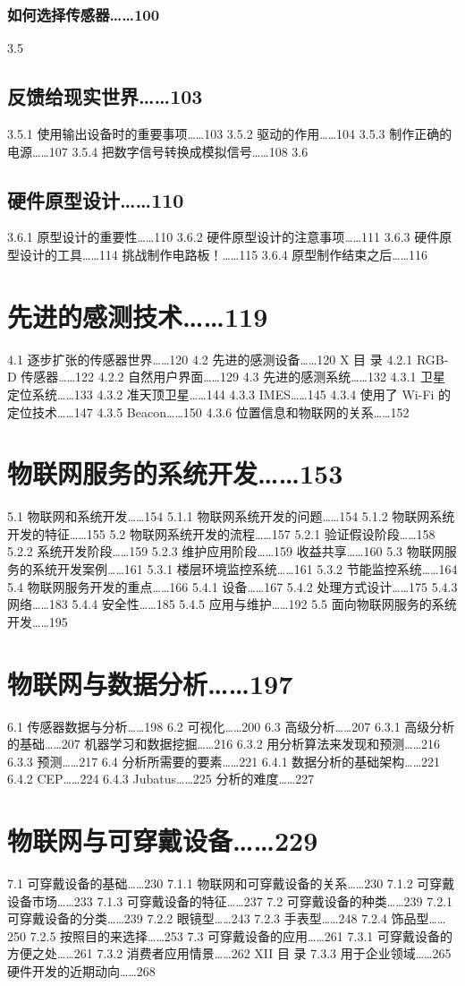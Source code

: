 \documentclass[12pt,UTF8]{ctexbook}
\begin{document}
\subsection{如何选择传感器……100}
3.5
\section{反馈给现实世界……103}
3.5.1
使用输出设备时的重要事项……103
3.5.2
驱动的作用……104
3.5.3
制作正确的电源……107
3.5.4
把数字信号转换成模拟信号……108
3.6
\section{硬件原型设计……110}
3.6.1
原型设计的重要性……110
3.6.2
硬件原型设计的注意事项……111
3.6.3
硬件原型设计的工具……114
挑战制作电路板！……115
3.6.4
原型制作结束之后……116

\chapter{先进的感测技术……119}
4.1
逐步扩张的传感器世界……120
4.2
先进的感测设备……120
X
目
录
4.2.1
RGB-D 传感器……122
4.2.2
自然用户界面……129
4.3
先进的感测系统……132
4.3.1
卫星定位系统……133
4.3.2
准天顶卫星……144
4.3.3
IMES……145
4.3.4
使用了 Wi-Fi 的定位技术……147
4.3.5
Beacon……150
4.3.6
位置信息和物联网的关系……152

\chapter{物联网服务的系统开发……153}
5.1
物联网和系统开发……154
5.1.1
物联网系统开发的问题……154
5.1.2
物联网系统开发的特征……155
5.2
物联网系统开发的流程……157
5.2.1
验证假设阶段……158
5.2.2
系统开发阶段……159
5.2.3
维护应用阶段……159
收益共享……160
5.3
物联网服务的系统开发案例……161
5.3.1
楼层环境监控系统……161
5.3.2
节能监控系统……164
5.4
物联网服务开发的重点……166
5.4.1
设备……167
5.4.2
处理方式设计……175
5.4.3
网络……183
5.4.4
安全性……185
5.4.5
应用与维护……192
5.5
面向物联网服务的系统开发……195

\chapter{物联网与数据分析……197}
6.1
传感器数据与分析……198
6.2
可视化……200
6.3
高级分析……207
6.3.1
高级分析的基础……207
机器学习和数据挖掘……216
6.3.2
用分析算法来发现和预测……216
6.3.3
预测……217
6.4
分析所需要的要素……221
6.4.1
数据分析的基础架构……221
6.4.2
CEP……224
6.4.3
Jubatus……225
分析的难度……227

\chapter{物联网与可穿戴设备……229}
7.1
可穿戴设备的基础……230
7.1.1
物联网和可穿戴设备的关系……230
7.1.2
可穿戴设备市场……233
7.1.3
可穿戴设备的特征……237
7.2
可穿戴设备的种类……239
7.2.1
可穿戴设备的分类……239
7.2.2
眼镜型……243
7.2.3
手表型……248
7.2.4
饰品型……250
7.2.5
按照目的来选择……253
7.3
可穿戴设备的应用……261
7.3.1
可穿戴设备的方便之处……261
7.3.2
消费者应用情景……262
XII
目
录
7.3.3
用于企业领域……265
硬件开发的近期动向……268
\end{document}
